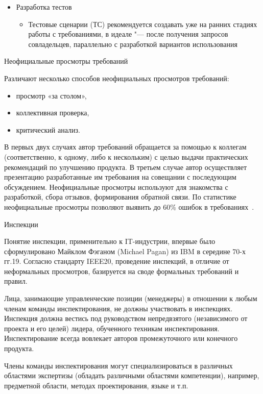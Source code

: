 \documentclass{../industrial-development}
\begin{document}
{\begin{frame}
\begin{itemize}
\item  \alert{Разработка тестов}
\begin{itemize}
\item Тестовые сценарии (ТС) рекомендуется создавать уже на ранних стадиях работы с требованиями, в идеале "--- после получения запросов совладельцев, параллельно с разработкой вариантов использования
\end{itemize}
\end{itemize}
\end{frame}

\lecturenotes

\alert{Неофициальные просмотры требований}

Различают несколько способов неофициальных просмотров требований:
\begin{itemize}
\item просмотр «за столом»,
\item коллективная проверка,
\item критический анализ.
\end{itemize}

В первых двух случаях автор требований обращается за помощью к коллегам (соответственно, к одному, либо к нескольким) с целью выдачи практических рекомендаций по улучшению продукта. В третьем случае автор осуществляет презентацию разработанные им требования на совещании с последующим обсуждением. Неофициальные просмотры используют для знакомства с разработкой, сбора отзывов, формирования обратной связи. По статистике неофициальные просмотры позволяют выявить до 60\% ошибок в требованиях~\cite[с.~66-67]{Maglinec}.

\alert{Инспекции}

Понятие инспекции, применительно к IT-индустрии, впервые было сформулировано Майклом Фэганом (Michael Pagan) из IBM в середине 70-х гг.19. Согласно стандарту IEEE20, проведение инспекций, в отличие от неформальных просмотров, базируется на своде формальных требований и правил. 

Лица, занимающие управленческие позиции (менеджеры) в отношении к любым членам команды инспектирования, не должны участвовать в инспекциях. Инспекция должна вестись под руководством непредвзятого (независимого от проекта и его целей) лидера, обученного техникам инспектирования. Инспектирование всегда вовлекает авторов промежуточного или конечного продукта.

Члены команды инспектирования могут специализироваться в различных областями экспертизы (обладать различными областями компетенции), например, предметной области, методах проектирования, языке и т.п. 

}
\end{document}
